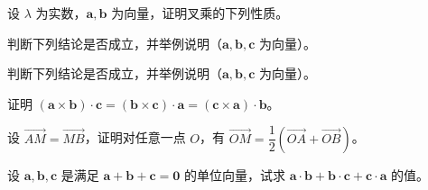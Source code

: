 \noindent\begin{minipage}{\textwidth}
设 $\lambda$ 为实数，$\mathbf a,\mathbf b$ 为向量，证明叉乘的下列性质。
\end{minipage}\par\vfill
\noindent\begin{minipage}{\textwidth}
判断下列结论是否成立，并举例说明（$\mathbf a,\mathbf b,\mathbf c$ 为向量）。
\end{minipage}\par\vfill
\newpage
\noindent\begin{minipage}{\textwidth}
判断下列结论是否成立，并举例说明（$\mathbf a,\mathbf b,\mathbf c$ 为向量）。
\end{minipage}\par\vfill
\noindent\begin{minipage}{\textwidth}
证明 $(\mathbf a\times\mathbf b)\cdot\mathbf c=(\mathbf b\times\mathbf c)\cdot\mathbf a=(\mathbf c\times\mathbf a)\cdot\mathbf b$。
\end{minipage}\par\vfill
\noindent\begin{minipage}{\textwidth}
设 $\overrightarrow{AM}=\overrightarrow{MB}$，证明对任意一点 $O$，有 $\overrightarrow{OM}=\dfrac12(\overrightarrow{OA}+\overrightarrow{OB})$。
\end{minipage}\par\vfill
\noindent\begin{minipage}{\textwidth}
设 $\mathbf a,\mathbf b,\mathbf c$ 是满足 $\mathbf a+\mathbf b+\mathbf c=\mathbf0$ 的单位向量，试求 $\mathbf a\cdot\mathbf b+\mathbf b\cdot\mathbf c+\mathbf c\cdot\mathbf a$ 的值。
\end{minipage}\par\vfill
